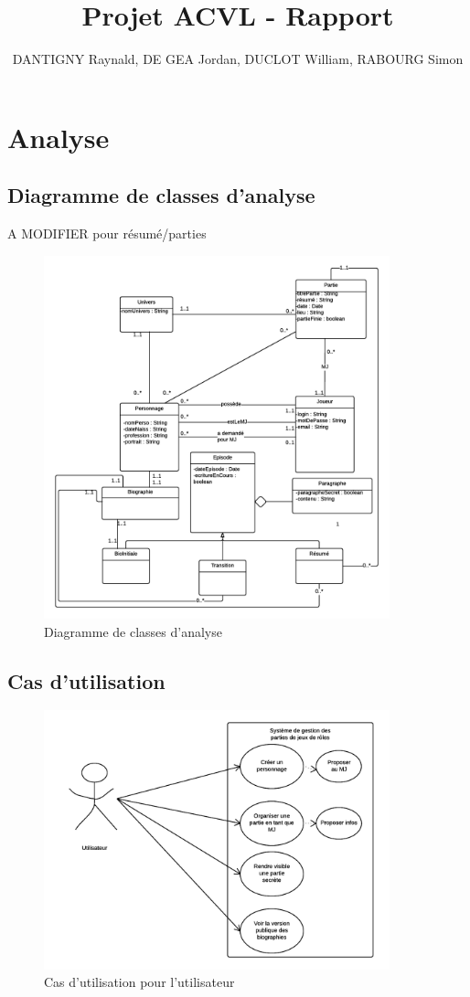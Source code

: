 \documentclass[a4paper,oneside,10pt]{article}
\title{Projet ACVL - Rapport}
\author{DANTIGNY Raynald, DE GEA Jordan, DUCLOT William, RABOURG Simon}
\begin{document}
\maketitle

\section{Analyse}
\subsection{Diagramme de classes d'analyse}
A MODIFIER pour résumé/parties
\begin{figure}[!ht]
\begin{center}
\includegraphics[width=10cm]{images/classe/DiagrammeClasse.png} 
	\caption{Diagramme de classes d'analyse}
\end{center}
\end{figure}
\subsection{Cas d'utilisation}
\begin{figure}[!ht]
	\begin{center}
\includegraphics[width=10cm]{images/utilisation/UserCU.png} 
	\caption{Cas d'utilisation pour l'utilisateur}
\end{center}
\end{figure}
\end{document}
